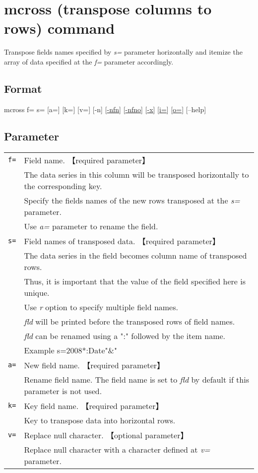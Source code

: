 \documentclass[a4paper]{jarticle}
\begin{document}
\setlength{\baselineskip}{4mm}

\section*{mcross (transpose columns to rows) command}
Transpose fields names specified by \emph{s=} parameter horizontally and itemize the array of data specified at the \emph{f=} parameter accordingly. 

\subsection*{Format}
mcross f= s= [a=] [k=] [v=] [-n]    
[\href{run:option.pdf}{-nfn}] 
[\href{run:option.pdf}{-nfno}] 
[\href{run:option.pdf}{-x}] 
[\href{run:option.pdf}{i=}] 
[\href{run:option.pdf}{o=}] 
[--help]\\

\subsection*{Parameter}
\begin{table}[htbp]
{\small
\begin{tabular}{ll}
\verb|f=|    & Field name. 【required parameter】\\
& The data series in this column will be transposed horizontally to the corresponding key. \\
& Specify the fields names of the new rows transposed at the \emph{s=} parameter. \\
& Use \emph{a=} parameter to rename the field. \\
\verb|s=|    & Field names of transposed data. 【required parameter】 \\
& The data series in the field becomes column name of transposed rows.\\
& Thus, it is important that the value of the field specified here is unique.\\
& Use \emph{r} option to specify multiple field names. \\
& \emph{fld} will be printed before the transposed rows of field names. \\
& \emph{fld} can be renamed using a ":" followed by the item name. \\
& Example  s=2008*:Date"\&"\\
\verb|a=|    & New field name. 【required parameter】\\
& Rename field name.  The field name is set to \emph{fld} by default if this parameter is not used. \\
\verb|k=|    & Key field name. 【required parameter】\\
& Key to transpose data into horizontal rows. \\
\verb|v=|    & Replace null character.  【optional parameter】\\
& Replace null character with a character defined at \emph{v=} parameter. \\
\end{tabular} 
}
\end{table} 
\end{document}
